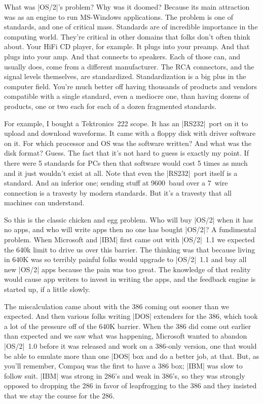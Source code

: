 What was |OS/2|'s problem?  Why was it doomed?  Because its main attraction
was as an engine to run MS-Windows applications.  The problem is one of
standards, and one of critical mass.  Standards are of incredible importance
in the computing world.  They're critical in other domains that folks
don't often think about.  Your HiFi CD player, for example.  It plugs into
your preamp.  And that plugs into your amp.  And that connects to speakers.
Each of those can, and usually does, come from a different manufacturer.
The RCA connectors, and the signal levels themselves, are standardized.
Standardization is a big plus in the computer field.  You're much better off
having thousands of products and vendors compatible with a single standard,
even a mediocre one, than having dozens of products, one or two each for
each of a dozen fragmented standards.

For example, I bought a Tektronics~222 scope.  It has an |RS232|~port on
it to upload and download waveforms.  It came with a floppy disk with
driver software on it.  For which processor and OS was the software written?
And what was the disk format?  Guess.  The fact that it's not hard to
guess is exactly my point.  If there were 5 standards for PCs then
that software would cost 5 times as much and it just wouldn't exist at all.  
Note that even the |RS232|~port
itself is a standard.  And an inferior one; sending stuff at 9600~baud
over a 7~wire connection is a travesty by modern standards.  But it's
a travesty that all machines can understand.

So this is the classic chicken and egg problem.  Who will buy |OS/2| when
it has no apps, and who will write apps then no one has bought |OS/2|?
A fundimental problem.  When Microsoft and |IBM| first came out with |OS/2|~1.1
we expected the 640k limit to drive us over this barrier.  The thinking
was that because living in 640K was so terribly painful folks would
upgrade to |OS/2|~1.1 and buy all new |OS/2| apps because the pain was too
great.  The knowledge of that reality would cause app writers to
invest in writing the apps, and the feedback engine is started up, if
a little slowly.  

The miscalculation came about with the 386 coming out sooner than we
expected.  And then various folks writing |DOS| extenders for the 386,
which took a lot of the pressure off of the 640K barrier.  When the
386 did come out earlier than expected and we saw what was happening, 
Microsoft wanted to abandon
|OS/2|~1.0 before it was released and work on a 386-only version, one that
would be able to emulate more than one |DOS| box and do a better job, at that.
But, as you'll remember, Compaq was the first to have a 386 box; |IBM|
was slow to follow suit.  |IBM| was strong in 286's and weak in 386's,
so they was strongly opposed to dropping the 286
in favor of leapfrogging to the 386 and they insisted that we stay the course
for the 286.  

